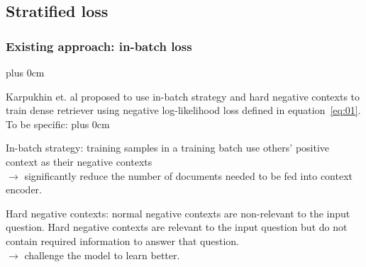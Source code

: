 \documentclass[11pt]{beamer}
\renewcommand{\raggedright}{\leftskip=0pt \rightskip=0pt plus 0cm}
\let\olditemize=\itemize
\renewenvironment{itemize}{\olditemize\raggedright}{\endlist}
\begin{document}
\subsection{Stratified loss}
\begin{frame}
\frametitle{Existing approach: in-batch loss}
\begin{adjustwidth}{-2em}{0em}
\begin{itemize}
	\item Karpukhin et. al \cite{dpr} proposed to use in-batch strategy and hard negative contexts to train dense retriever using negative log-likelihood loss defined in equation~\eqref{eq:01}. To be specific:
	\begin{itemize}
		\item In-batch strategy: training samples in a training batch use others' positive context as their negative contexts \\ $\rightarrow$ significantly reduce the number of documents needed to be fed into context encoder.
		\item Hard negative contexts: normal negative contexts are non-relevant to the input question. Hard negative contexts are relevant to the input question but do not contain required information to answer that question. \\[5pt]
		$\rightarrow$ challenge the model to learn better.
	\end{itemize}
\end{itemize}
\end{adjustwidth}
\end{frame}
\end{document}

